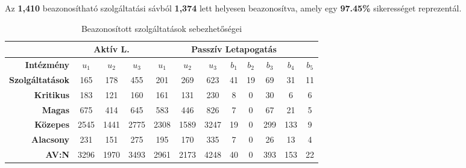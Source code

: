 \documentclass[a4paper,12pt]{article}
\begin{document}
	Az \textbf{1,410} beazonosítható szolgáltatási sávból \textbf{1,374} lett helyesen beazonosítva, amely egy \textbf{97.45\%} sikerességet reprezentál.
	
	\begin{table}[H]
		\centering
		\begin{tabular}{r|ccc|ccc|ccccc|}
			\cline{2-12}
			\multicolumn{1}{l|}{}                         & \multicolumn{3}{c|}{\textbf{Aktív L.}} & \multicolumn{8}{c|}{\textbf{Passzív Letapogatás}}                                                             \\ \hline
			\multicolumn{1}{|r|}{\textbf{Intézmény}}      & \textbf{$u_1$}    & \textbf{$u_2$}    & \textbf{$u_3$}   & \textbf{$u_1$} & \textbf{$u_2$} & \textbf{$u_3$} & \textbf{$b_1$} & \textbf{$b_2$} & \textbf{$b_3$} & \textbf{$b_4$} & \textbf{$b_5$} \\
			\multicolumn{1}{|r|}{\textbf{Szolgáltatások}} & 165            & 178            & 455           & 201         & 269         & 623         & 41          & 19          & 69          & 31          & 11          \\ \hline
			\multicolumn{1}{|r|}{\textbf{Kritikus}}       & 183            & 121            & 160           & 161         & 131         & 230         & 8           & 0           & 30          & 6           & 6           \\
			\multicolumn{1}{|r|}{\textbf{Magas}}          & 675            & 414            & 645           & 583         & 446         & 826         & 7           & 0           & 67          & 21          & 5           \\
			\multicolumn{1}{|r|}{\textbf{Közepes}}        & 2545           & 1441           & 2775          & 2308        & 1589        & 3247        & 19          & 0           & 299         & 133         & 9           \\
			\multicolumn{1}{|r|}{\textbf{Alacsony}}       & 231            & 151            & 275           & 195         & 170         & 335         & 7           & 0           & 26          & 13          & 4           \\
			\multicolumn{1}{|r|}{\textbf{AV:N}}           & 3296           & 1970           & 3493          & 2961        & 2173        & 4248        & 40          & 0           & 393         & 153         & 22          \\ \hline
		\end{tabular}
		\caption{Beazonosított szolgáltatások sebezhetőségei}
		\label{cpevulns}
	\end{table}
	
\end{document}
